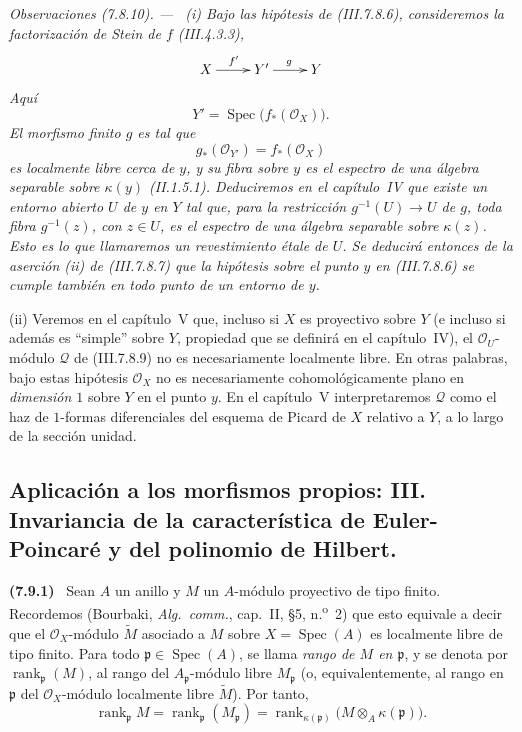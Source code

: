 \documentclass[10pt,oneside]{book}
\newcommand{\kres}{\kappa}
\newcommand{\Spec}{\operatorname{Spec}}
\newcommand{\sref}[2][]{\textup{(#2)}}
\newcommand{\oldpage}[2][]{\setcounter{footnote}{0}\marginpar{\scriptsize\textbf{#1}~|~#2}\ignorespaces}
\newenvironment{env}[1][]{\par\medskip\noindent\textbf{(#1)}\ }{\par}
\newenvironment{remarks}[1][]{\par\medskip\noindent\itshape Observaciones (#1). ---\ }{\par}
\begin{document}
\begin{remarks}[7.8.10]
\label{III.7.8.10}
\textnormal{(i)}
Bajo las hipótesis de \sref{III.7.8.6}, consideremos la
factorización de Stein de $f$ \sref{III.4.3.3},
\[
  \xymatrix{
    X \ar[r]^{f'} & Y' \ar[r]^{g} & Y
  }
\]
\oldpage[III]{208}
Aquí
\[
  Y'=\Spec\bigl(f_*(\mathscr O_X)\bigr).
\]
El morfismo finito $g$ es tal que
\[
  g_*(\mathscr O_{Y'})=f_*(\mathscr O_X)
\]
es localmente libre cerca de $y$, y su fibra sobre $y$ es el
espectro de una álgebra separable sobre $\kres(y)$
\sref[II]{II.1.5.1}. Deduciremos en el capítulo~IV que existe un
entorno abierto $U$ de $y$ en $Y$ tal que, para la restricción
$g^{-1}(U)\to U$ de $g$, \emph{toda} fibra $g^{-1}(z)$, con
$z\in U$, es el espectro de una álgebra separable sobre $\kres(z)$.
Esto es lo que llamaremos un \emph{revestimiento étale} de $U$. Se
deducirá entonces de la aserción (ii) de \sref{III.7.8.7} que la
hipótesis sobre el punto $y$ en \sref{III.7.8.6} se cumple también
en todo punto de un entorno de $y$.

\medskip
\textnormal{(ii)}
Veremos en el capítulo~V que, incluso si $X$ es proyectivo sobre $Y$
(e incluso si además es ``simple'' sobre $Y$, propiedad que se
definirá en el capítulo~IV), el $\mathscr O_U$-módulo $\mathscr Q$
de \sref{III.7.8.9} no es necesariamente localmente libre. En otras
palabras, bajo estas hipótesis $\mathscr O_X$ no es necesariamente
cohomológicamente plano en \emph{dimensión $1$} sobre $Y$ en el
punto $y$. En el capítulo~V interpretaremos $\mathscr Q$ como el haz
de $1$-formas diferenciales del esquema de Picard de $X$ relativo a
$Y$, a lo largo de la sección unidad.
\end{remarks}

\subsection{Aplicación a los morfismos propios: III. Invariancia de la
característica de Euler-Poincaré y del polinomio de Hilbert.}
\label{subsection:III.7.9}
\label{III.7.9}

\begin{env}[7.9.1]
\label{III.7.9.1}
Sean $A$ un anillo y $M$ un $A$-módulo proyectivo de tipo finito.
Recordemos (Bourbaki, \emph{Alg.~comm.}, cap.~II, \S5, n.\textsuperscript{o}~2)
que esto equivale a decir que el $\mathscr O_X$-módulo $\widetilde M$
asociado a $M$ sobre $X=\Spec(A)$ es localmente libre de tipo finito.
Para todo $\mathfrak p\in\Spec(A)$, se llama \emph{rango de $M$ en
$\mathfrak p$}, y se denota por $\operatorname{rank}_{\mathfrak p}(M)$,
al rango del $A_{\mathfrak p}$-módulo libre $M_{\mathfrak p}$ (o,
equivalentemente, al rango en $\mathfrak p$ del $\mathscr O_X$-módulo
localmente libre $\widetilde M$). Por tanto,
\[
  \operatorname{rank}_{\mathfrak p}M
  =
  \operatorname{rank}_{\mathfrak p}(M_{\mathfrak p})
  =
  \operatorname{rank}_{\kres(\mathfrak p)}
    \bigl(M\otimes_A\kres(\mathfrak p)\bigr).
  \tag{7.9.1.1}\label{III.7.9.1.1}
\]
\end{env}
\end{document}

